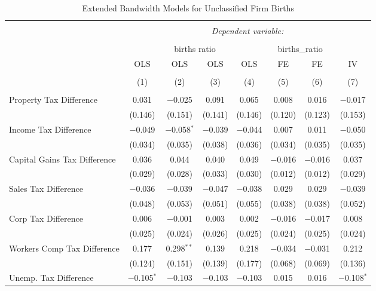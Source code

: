 
\begin{table}[!htbp] \centering 
  \caption{Extended Bandwidth Models for  Unclassified Firm Births} 
  \label{} 
\begin{tabular}{@{\extracolsep{5pt}}lccccccc} 
\\[-1.8ex]\hline 
\hline \\[-1.8ex] 
 & \multicolumn{7}{c}{\textit{Dependent variable:}} \\ 
\cline{2-8} 
\\[-1.8ex] & \multicolumn{4}{c}{births ratio} & \multicolumn{2}{c}{births\_ratio} &   \\ 
 & OLS & OLS & OLS & OLS & FE & FE & IV \\ 
\\[-1.8ex] & (1) & (2) & (3) & (4) & (5) & (6) & (7)\\ 
\hline \\[-1.8ex] 
 Property Tax Difference & 0.031 & $-$0.025 & 0.091 & 0.065 & 0.008 & 0.016 & $-$0.017 \\ 
  & (0.146) & (0.151) & (0.141) & (0.146) & (0.120) & (0.123) & (0.153) \\ 
  Income Tax Difference & $-$0.049 & $-$0.058$^{*}$ & $-$0.039 & $-$0.044 & 0.007 & 0.011 & $-$0.050 \\ 
  & (0.034) & (0.035) & (0.038) & (0.036) & (0.034) & (0.035) & (0.035) \\ 
  Capital Gains Tax Difference & 0.036 & 0.044 & 0.040 & 0.049 & $-$0.016 & $-$0.016 & 0.037 \\ 
  & (0.029) & (0.028) & (0.033) & (0.030) & (0.012) & (0.012) & (0.029) \\ 
  Sales Tax Difference & $-$0.036 & $-$0.039 & $-$0.047 & $-$0.038 & 0.029 & 0.029 & $-$0.039 \\ 
  & (0.048) & (0.053) & (0.051) & (0.055) & (0.038) & (0.038) & (0.052) \\ 
  Corp Tax Difference & 0.006 & $-$0.001 & 0.003 & 0.002 & $-$0.016 & $-$0.017 & 0.008 \\ 
  & (0.025) & (0.024) & (0.026) & (0.025) & (0.024) & (0.025) & (0.024) \\ 
  Workers Comp Tax Difference & 0.177 & 0.298$^{**}$ & 0.139 & 0.218 & $-$0.034 & $-$0.031 & 0.212 \\ 
  & (0.124) & (0.151) & (0.139) & (0.177) & (0.068) & (0.069) & (0.136) \\ 
  Unemp. Tax Difference & $-$0.105$^{*}$ & $-$0.103 & $-$0.103 & $-$0.103 & 0.015 & 0.016 & $-$0.108$^{*}$ \\ 

\end{tabular}
\end{table}
